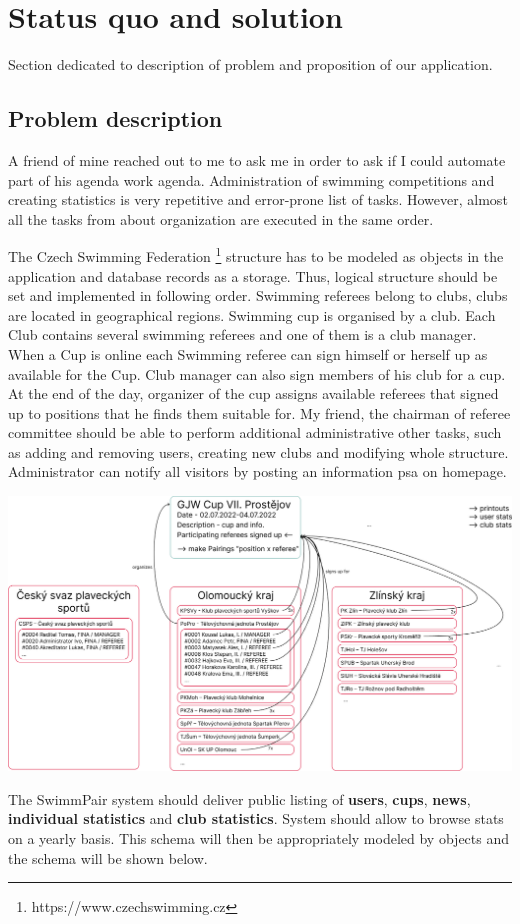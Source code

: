 \chapter{Status quo and solution}
Section dedicated to description of problem and proposition of our application.
\section{Problem description}
\par
A friend of mine reached out to me to ask me in order to ask if I could automate part of his agenda work agenda. Administration of swimming competitions and creating statistics is very repetitive and error-prone list of tasks. However, almost all the tasks from about organization are executed in the same order.
\par
The Czech Swimming Federation \footnote{https://www.czechswimming.cz} structure has to be modeled as objects in the application and database records as a storage. Thus, logical structure should be set and implemented in following order. Swimming referees belong to clubs, clubs are located in geographical regions. Swimming cup is organised by a club. Each Club contains several swimming referees and one of them is a club manager. When a Cup is online each Swimming referee can sign himself or herself up as available for the Cup. Club manager can also sign members of his club for a cup. At the end of the day, organizer of the cup assigns available referees that signed up to positions that he finds them suitable for. My friend, the chairman of referee committee should be able to perform additional administrative other tasks, such as adding and removing users, creating new clubs and modifying whole structure. Administrator can notify all visitors by posting an information psa on homepage.
\par
\includegraphics[scale=0.335]{img/swimmpair_schema.png}
\par
The SwimmPair system should deliver public listing of \textbf{users}, \textbf{cups}, \textbf{news}, \textbf{individual statistics} and \textbf{club statistics}. System should allow to browse stats on a yearly basis. This schema will then be appropriately modeled by objects and the schema will be shown below. 
